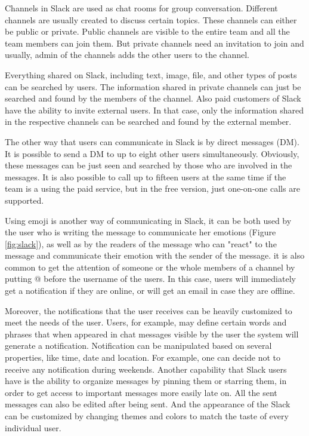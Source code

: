 Channels in Slack are used as chat rooms for group conversation. Different channels are usually created to discuss certain topics. These channels can either be public or private. Public channels are visible to the entire team and all the team members can join them. But private channels need an invitation to join and usually, admin of the channels adds the other users to the channel.
 
Everything shared on Slack, including text, image, file, and other types of posts can be searched by users. The information shared in private channels can just be searched and found by the members of the channel. Also paid customers of Slack have the ability to invite external users. In that case, only the information shared in the respective channels can be searched and found by the external member.

The other way that users can communicate in Slack is by direct messages (DM). It is possible to send a DM to up to eight other users simultaneously. Obviously, these messages can be just seen and searched by those who are involved in the messages. It is also possible to call up to fifteen users at the same time if the team is a using the paid service, but in the free version, just one-on-one calls are supported. 

Using emoji is another way of communicating in Slack, it can be both used by the user who is writing the message to communicate her emotions (Figure \ref{fig:slack}), as well as by the readers of the message who can "react" to the message and communicate their emotion with the sender of the message. it is also common to get the attention of someone or the whole members of a channel by putting @ before the username of the users. In this case, users will immediately get a notification if they are online, or will get an email in case they are offline.

Moreover, the notifications that the user receives can be heavily customized to meet the needs of the user. Users, for example, may define certain words and phrases that when appeared in chat messages visible by the user the system will generate a notification. Notification can be manipulated based on several properties, like time, date and location. For example, one can decide not to receive any notification during weekends. Another capability that Slack users have is the ability to organize messages by pinning them or starring them, in order to get access to important messages more easily late on. All the sent messages can also be edited after being sent. And the appearance of the Slack can be customized by changing themes and colors to match the taste of every individual user. 

